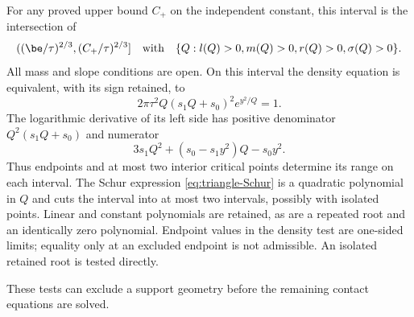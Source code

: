 For any proved upper bound $C_+$ on the independent constant, this
interval is the intersection of
\[
 ((\be/\tau)^{2/3},(C_+/\tau)^{2/3}]
 \quad\text{with}\quad
 \{Q:l(Q)>0, m(Q)>0, r(Q)>0, \sigma(Q)>0\}.
\]
All mass and slope conditions are open. On this interval the density
equation is equivalent, with its sign retained, to
\begin{equation}\label{eq:triangle-density-squared}
       2\pi\tau^2 Q(s_1Q+s_0)^2 e^{y^2/Q}=1.
\end{equation}
The logarithmic derivative of its left side has positive denominator
$Q^2(s_1Q+s_0)$ and numerator
\[
          3s_1Q^2+(s_0-s_1y^2)Q-s_0y^2.
\]
Thus endpoints and at most two interior critical points determine its
range on each interval. The Schur expression
\eqref{eq:triangle-Schur} is a quadratic polynomial in $Q$ and cuts
the interval into at most two intervals, possibly with isolated points.
Linear and constant polynomials are retained, as are a repeated root
and an identically zero polynomial. Endpoint values in the density
test are one-sided limits; equality only at an excluded endpoint is
not admissible. An isolated retained root is tested directly.

These tests can exclude a support geometry before the remaining
contact equations are solved.
